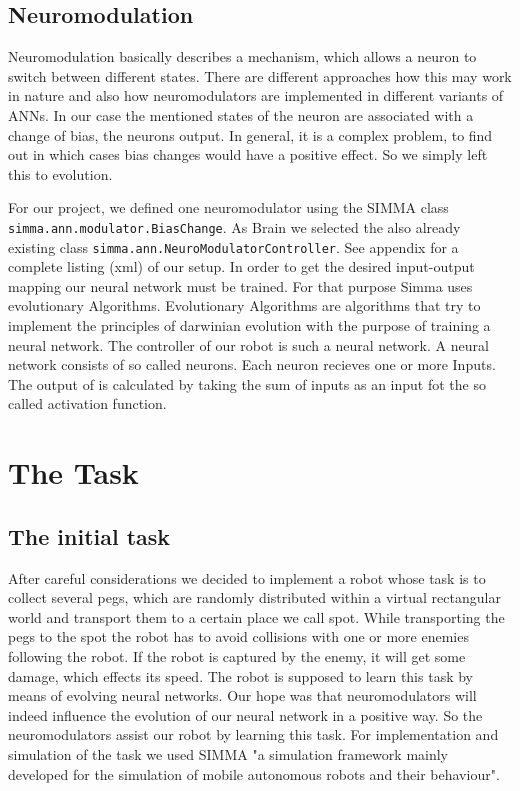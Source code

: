 \documentclass[12pt,fleqn,a4paper]{article}
\begin{document}
\subsection{Neuromodulation}
Neuromodulation basically describes a mechanism, which allows a neuron to switch between different states. There are different approaches how this may work in nature and also how neuromodulators are implemented in different variants of ANNs. In our case the mentioned states of the neuron are associated with a change of bias, the neurons output. In general, it is a complex problem, to find out in which cases bias changes would have a positive effect. So we simply left this to evolution.

For our project, we defined one neuromodulator using the SIMMA class\\ \texttt{simma.ann.modulator.BiasChange}. As Brain we selected the also already existing class \texttt{simma.ann.NeuroModulatorController}. See appendix for a complete listing (xml) of our setup.
In order to get the desired input-output mapping our neural network must be trained.
For that purpose Simma uses evolutionary Algorithms. Evolutionary Algorithms are algorithms that try to implement the principles of darwinian evolution with the purpose of training a neural network. The controller of our robot is such a neural network.
A neural network consists of so called neurons. Each neuron recieves one or more Inputs. The output of is calculated by taking the sum of inputs as an input fot the so called activation function.



\section{The Task}

\subsection{The initial task}
After careful considerations we decided to implement a robot whose task is to collect several pegs, which are randomly distributed within a virtual rectangular world and transport them to a certain place we call spot. While transporting the pegs to the spot the robot has to avoid collisions with one or more enemies following the robot. If the robot is captured by the enemy, it will get some damage, which effects its speed. The robot is supposed to learn this task by means of evolving neural networks. Our hope was that neuromodulators will indeed influence the evolution of our neural network in a positive way. So the neuromodulators assist our robot by learning this task. For implementation and simulation of the task we used SIMMA "a simulation framework mainly developed for the simulation of mobile autonomous robots and their behaviour".
\end{document}
